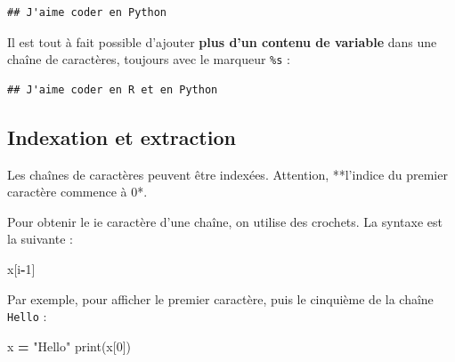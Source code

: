 \documentclass[12pt,]{book}
\newenvironment{Shaded}{\begin{snugshade}}{\end{snugshade}}
\newcommand{\DecValTok}[1]{\textcolor[rgb]{0.00,0.00,0.81}{#1}}
\newcommand{\SpecialCharTok}[1]{\textcolor[rgb]{0.00,0.00,0.00}{#1}}
\newcommand{\StringTok}[1]{\textcolor[rgb]{0.31,0.60,0.02}{#1}}
\newcommand{\OperatorTok}[1]{\textcolor[rgb]{0.81,0.36,0.00}{\textbf{#1}}}
\newcommand{\BuiltInTok}[1]{#1}
\newcommand{\NormalTok}[1]{#1}
\numberwithin{equation}{section}
\numberwithin{countremarque}{section}
\begin{document}
\begin{Shaded}
\end{Shaded}

\begin{lstlisting}
## J'aime coder en Python
\end{lstlisting}

Il est tout à fait possible d'ajouter \textbf{plus d'un contenu de
variable} dans une chaîne de caractères, toujours avec le marqueur
\texttt{\%s} :

\begin{Shaded}
\end{Shaded}

\begin{lstlisting}
## J'aime coder en R et en Python
\end{lstlisting}

\subsection{Indexation et extraction}\label{indexation-et-extraction}

Les chaînes de caractères peuvent être indexées. Attention, **l'indice
du premier caractère commence à 0*.

Pour obtenir le ie caractère d'une chaîne, on utilise des crochets. La
syntaxe est la suivante :

\begin{Shaded}
\begin{Highlighting}[]
\NormalTok{x[i}\OperatorTok{-}\DecValTok{1}\NormalTok{]}
\end{Highlighting}
\end{Shaded}

Par exemple, pour afficher le premier caractère, puis le cinquième de la
chaîne \texttt{Hello} :

\begin{Shaded}
\begin{Highlighting}[]
\NormalTok{x }\OperatorTok{=} \StringTok{"Hello"}
\BuiltInTok{print}\NormalTok{(x[}\DecValTok{0}\NormalTok{])}
\end{Highlighting}
\end{Shaded}
\end{document}
